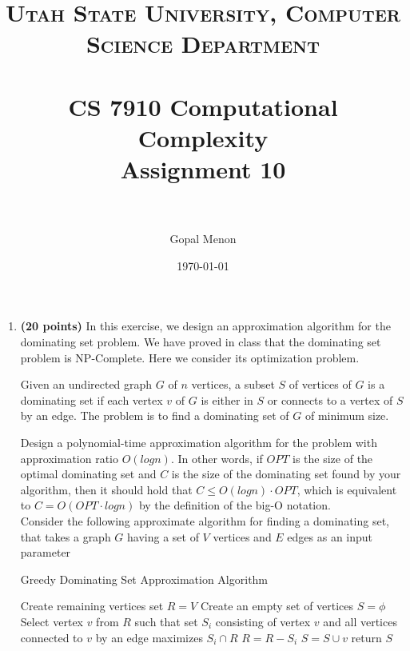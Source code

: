 \documentclass[paper=a4, fontsize=11pt]{scrartcl} %
\title{	
\normalfont \normalsize 
\textsc{Utah State University, Computer Science Department} \\ [25pt] %
\horrule{0.5pt} \\[0.4cm] %
\huge CS 7910 Computational Complexity\\Assignment 10\\ %
\horrule{2pt} \\[0.5cm] %
}
\author{Gopal Menon} %
\date{\normalsize\today} %
\numberwithin{figure}{section} %
\numberwithin{table}{section} %
\begin{document}
\maketitle %

\begin{enumerate}
\item \textbf{(20 points)} In this exercise, we design an approximation algorithm for the dominating set
problem. We have proved in class that the dominating set problem is NP-Complete. Here we consider its optimization problem.

Given an undirected graph $G$ of $n$ vertices, a subset $S$ of vertices of $G$ is a dominating set if
each vertex $v$ of $G$ is either in $S$ or connects to a vertex of $S$ by an edge. The problem is to
find a dominating set of $G$ of minimum size.

Design a polynomial-time approximation algorithm for the problem with approximation ratio
$O(log n)$. In other words, if $OPT$ is the size of the optimal dominating set and $C$ is the size
of the dominating set found by your algorithm, then it should hold that $C \leq O(log n) \cdot OP T$,
which is equivalent to $C = O(OPT \cdot log n)$ by the definition of the big-O notation.\\

Consider the following approximate algorithm for finding a dominating set, that takes a graph $G$ having a set of $V$ vertices and $E$ edges as an input parameter

\begin{minipage}{\linewidth}
  \begin{algorithm}[H]
    \caption{Greedy Dominating Set Approximation Algorithm}\label{DomSetApproxAlg}
    \begin{algorithmic}[1]
        \State Create remaining vertices set $R = V$
        \State Create an empty set of vertices $S = \phi$
          \State Select vertex $v$ from $R$ such that set $S_i$ consisting of vertex $v$    
          \State and all vertices connected to $v$ by an edge maximizes $S_i \cap R$
          \State $R = R - S_i$
          \State $S= S \cup v$
        \EndWhile
        \State return $S$
      \EndProcedure
    \end{algorithmic}
  \end{algorithm}
\end{minipage}\\


\end{enumerate}
\end{document}
